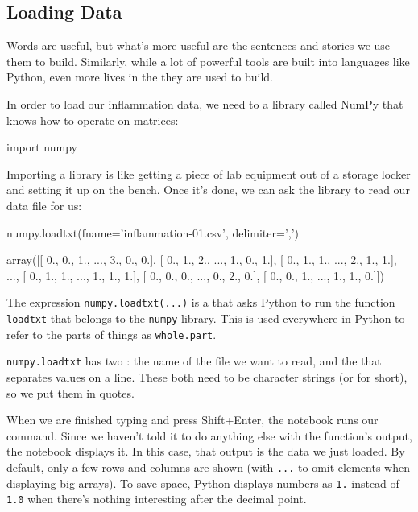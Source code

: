 \documentclass{book}
\begin{document}
\subsection{Loading Data}

Words are useful, but what's more useful are the sentences and stories
we use them to build. Similarly, while a lot of powerful tools are built
into languages like Python, even more lives in the
 they are used to build.

In order to load our inflammation data, we need to
 a library called NumPy that knows how to
operate on matrices:

\begin{VerbIn}
import numpy
\end{VerbIn}

Importing a library is like getting a piece of lab equipment out of a
storage locker and setting it up on the bench. Once it's done, we can
ask the library to read our data file for us:

\begin{VerbIn}
numpy.loadtxt(fname='inflammation-01.csv', delimiter=',')
\end{VerbIn}

\begin{VerbOut}
array([[ 0.,  0.,  1., ...,  3.,  0.,  0.],
       [ 0.,  1.,  2., ...,  1.,  0.,  1.],
       [ 0.,  1.,  1., ...,  2.,  1.,  1.],
       ...,
       [ 0.,  1.,  1., ...,  1.,  1.,  1.],
       [ 0.,  0.,  0., ...,  0.,  2.,  0.],
       [ 0.,  0.,  1., ...,  1.,  1.,  0.]])
\end{VerbOut}

The expression \texttt{numpy.loadtxt(...)} is a
 that asks Python to run the
function \texttt{loadtxt} that belongs to the \texttt{numpy} library.
This  is used everywhere in
Python to refer to the parts of things as \texttt{whole.part}.

\texttt{numpy.loadtxt} has two : the
name of the file we want to read, and the
 that separates values on a line. These
both need to be character strings (or  for
short), so we put them in quotes.

When we are finished typing and press Shift+Enter, the notebook runs our
command. Since we haven't told it to do anything else with the
function's output, the notebook displays it. In this case, that output
is the data we just loaded. By default, only a few rows and columns are
shown (with \texttt{...} to omit elements when displaying big arrays).
To save space, Python displays numbers as \texttt{1.} instead of
\texttt{1.0} when there's nothing interesting after the decimal point.
\end{document}
